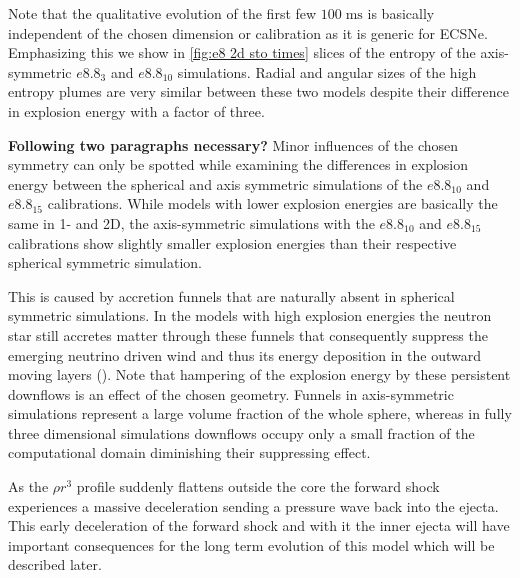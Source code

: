 \documentclass[fleqn,usenatbib]{mnras}
\newcommand{\COM}[1]{{\color{red}#1}}
\begin{document}
Note that the qualitative evolution of the first few $100\;\mathrm{ms}$ is basically independent of the chosen dimension or calibration as it is generic for ECSNe. Emphasizing this we show in \autoref{fig:e8 2d sto times} slices of the entropy of the axis-symmetric $e8.8_{3}$ and $e8.8_{10}$ simulations. Radial and angular sizes of the high entropy plumes are very similar between these two models despite their difference in explosion energy with a factor of three. 

\COM{\textbf{Following two paragraphs necessary?}
Minor influences of the chosen symmetry can only be spotted while examining the differences in explosion energy between the spherical and axis symmetric simulations of the $e8.8_{10}$ and $e8.8_{15}$ calibrations. While models with lower explosion energies are basically the same in 1- and 2D, the axis-symmetric simulations with the $e8.8_{10}$ and $e8.8_{15}$ calibrations show slightly smaller explosion energies than their respective spherical symmetric simulation.

This is caused by accretion funnels that are naturally absent in spherical symmetric simulations. 
In the models with high explosion energies the neutron star still accretes matter through these funnels that consequently suppress the emerging neutrino driven wind and thus its energy deposition in the outward moving layers (\cite{Muellera}). Note that hampering of the explosion energy by these persistent downflows is an effect of the chosen geometry. Funnels in axis-symmetric simulations represent a large volume fraction of the whole sphere, whereas in fully three dimensional simulations downflows occupy only a small fraction of the computational domain diminishing their suppressing effect.}

As the $\rho r^3$ profile suddenly flattens outside the core the forward shock experiences a massive deceleration sending a pressure wave back into the ejecta. This early deceleration of the forward shock and with it the inner ejecta will have important consequences for the long term evolution of this model which will be described later.
\end{document}
